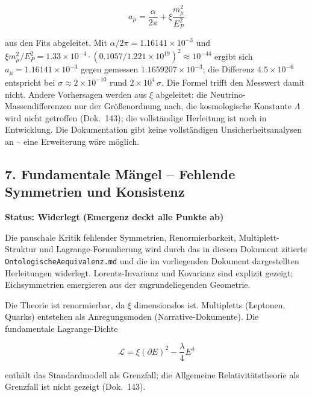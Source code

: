 \[
a_\mu = \frac{\alpha}{2\pi} + \xi \frac{m_\mu^2}{E_P^2}
\]

aus den Fits abgeleitet. Mit $\alpha/2\pi = 1.16141\times10^{-3}$ und $\xi m_\mu^2/E_P^2 = 1.33\times10^{-4}\cdot(0.1057/1.221\times10^{19})^2 \approx 10^{-44}$ ergibt sich $a_\mu = 1.16141\times10^{-3}$ gegen gemessen $1.1659207\times10^{-3}$; die Differenz $4.5\times10^{-6}$ entspricht bei $\sigma \approx 2\times10^{-10}$ rund $2\times10^4\,\sigma$. Die Formel trifft den Messwert damit nicht. Andere Vorhersagen werden aus $\xi$ abgeleitet: die Neutrino-Massendifferenzen nur der Größenordnung nach, die kosmologische Konstante \(\Lambda\) wird nicht getroffen (Dok.~143); die vollständige Herleitung ist noch in Entwicklung. Die Dokumentation gibt keine vollständigen Unsicherheitsanalysen an – eine Erweiterung wäre möglich.

\subsection{7. Fundamentale Mängel – Fehlende Symmetrien und Konsistenz}
\textbf{Status: Widerlegt (Emergenz deckt alle Punkte ab)}

Die pauschale Kritik fehlender Symmetrien, Renormierbarkeit, Multiplett-Struktur und Lagrange-Formulierung wird durch das in diesem Dokument zitierte \texttt{OntologischeAequivalenz.md} und die im vorliegenden Dokument dargestellten Herleitungen widerlegt. Lorentz-Invarianz und Kovarianz sind explizit gezeigt; Eichsymmetrien emergieren aus der zugrundeliegenden Geometrie.

Die Theorie ist renormierbar, da \(\xi\) dimensionslos ist. Multipletts (Leptonen, Quarks) entstehen als Anregungsmoden (Narrative-Dokumente). Die fundamentale Lagrange-Dichte

\[
\mathcal{L} = \xi (\partial E)^2 - \frac{\lambda}{4} E^4
\]

enthält das Standardmodell als Grenzfall; die Allgemeine Relativitätstheorie als Grenzfall ist nicht gezeigt (Dok.~143).